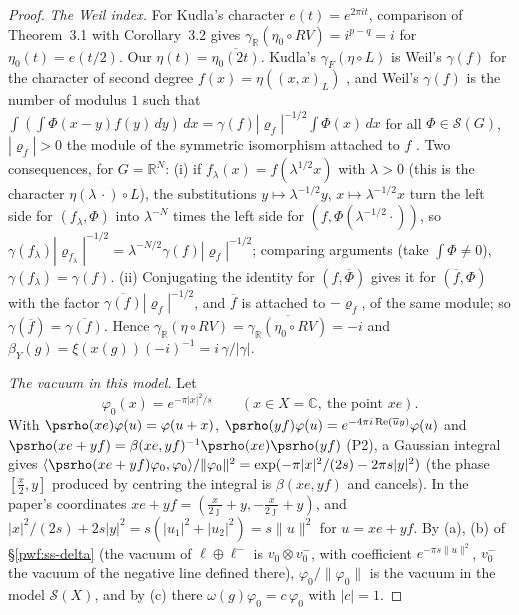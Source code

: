 \documentclass[10pt]{amsart}
\theoremstyle{definition}
\theoremstyle{remark}
\newcommand{\C}{\mathbb C}
\newcommand{\R}{\mathbb R}
\providecommand{\auS}{\mathcal S}
\providecommand{\aubar}[1]{\overline{#1}}
\begin{document}
\begin{proof}
\emph{The Weil index.} For Kudla's character $e(t)=e^{2\pi it}$, comparison of Theorem~3.1 with
Corollary~3.2 \cite[pp.~378--379]{KudlaSplitting} gives $\gamma_\R(\eta_0\circ RV)=i^{p-q}=i$ for
$\eta_0(t)=e(t/2)$. Our $\eta(t)=\aubar{\eta_0(2t)}$. Kudla's $\gamma_F(\eta\circ L)$ is Weil's
$\gamma(f)$ for the character of second degree $f(x)=\eta((x,x)_L)$ \cite[p.~364]{KudlaSplitting}, and
Weil's $\gamma(f)$ is the number of modulus $1$ such that $\int(\int\Phi(x-y)f(y)\,dy)\,dx=\gamma(f)
|\varrho_f|^{-1/2}\int\Phi(x)\,dx$ for all $\Phi\in\auS(G)$, $|\varrho_f|>0$ the module of the
symmetric isomorphism attached to $f$ \cite[Th\'eor\`eme~2, p.~161, and Corollaire~2, p.~162]{WeilActa}.
Two consequences, for $G=\R^N$: (i) if $f_\lambda(x)=f(\lambda^{1/2}x)$ with $\lambda>0$ (this is the
character $\eta(\lambda\,\cdot)\circ L$), the substitutions $y\mapsto\lambda^{-1/2}y$, $x\mapsto
\lambda^{-1/2}x$ turn the left side for $(f_\lambda,\Phi)$ into $\lambda^{-N}$ times the left side for
$(f,\Phi(\lambda^{-1/2}\cdot))$, so $\gamma(f_\lambda)|\varrho_{f_\lambda}|^{-1/2}=\lambda^{-N/2}\gamma(f)
|\varrho_f|^{-1/2}$; comparing arguments (take $\int\Phi\ne0$), $\gamma(f_\lambda)=\gamma(f)$. (ii)
Conjugating the identity for $(f,\aubar\Phi)$ gives it for $(\aubar f,\Phi)$ with the factor
$\aubar{\gamma(f)}|\varrho_f|^{-1/2}$, and $\aubar f$ is attached to $-\varrho_f$, of the same module;
so $\gamma(\aubar f)=\aubar{\gamma(f)}$. Hence $\gamma_\R(\eta\circ RV)=\aubar{\gamma_\R(\eta_0\circ RV)}=
-i$ and $\beta_Y(g)=\xi(x(g))(-i)^{-1}=i\,\gamma/|\gamma|$.

\emph{The vacuum in this model.} Let
\begin{equation}\label{pwf:eq-phi0}
\varphi_0(x)=e^{-\pi|x|^2/s}\qquad(x\in X=\C,\ \text{the point }xe).
\end{equation}
With
$\psrho(xe)\varphi(u)=\varphi(u+x)$, $\psrho(yf)\varphi(u)=e^{-4\pi i\operatorname{Re}(\aubar uy)}\varphi(u)$
and $\psrho(xe+yf)=\beta(xe,yf)^{-1}\psrho(xe)\psrho(yf)$ (P2), a Gaussian integral gives
$\langle\psrho(xe+yf)\varphi_0,\varphi_0\rangle/\|\varphi_0\|^2=\exp(-\pi|x|^2/(2s)-2\pi s|y|^2)$
(the phase $[\frac x2,y]$ produced by centring the integral is $\beta(xe,yf)$ and cancels). In the
paper's coordinates $xe+yf=(\frac x{2\jmath}+y,-\frac x{2\jmath}+y)$, and $|x|^2/(2s)+2s|y|^2=s(|u_1|^2+
|u_2|^2)=s\|u\|^2$ for $u=xe+yf$. By (a), (b) of \S\ref{pwf:ss-delta} (the vacuum of $\ell\oplus\ell^-$
is $v_0\otimes v_0^-$, with coefficient $e^{-\pi s\|u\|^2}$, $v_0^-$ the vacuum of the negative line
defined there), $\varphi_0/\|\varphi_0\|$ is the vacuum in the model $\auS(X)$, and by (c) there
$\omega(g)\varphi_0=c\,\varphi_0$ with $|c|=1$.


\end{proof}
\end{document}
